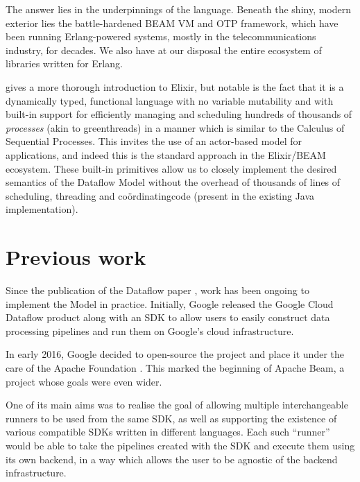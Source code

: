 The answer lies in the underpinnings of the language.
Beneath the shiny, modern exterior lies the battle-hardened BEAM VM and OTP framework, which have been running Erlang-powered systems, mostly in the telecommunications industry, for decades.
We also have at our disposal the entire ecosystem of libraries written for Erlang.

 gives a more thorough introduction to Elixir, but notable is the fact that it is a dynamically typed, functional language with no variable mutability and with built-in support for efficiently managing and scheduling hundreds of thousands of \emph{processes} (akin to greenthreads) in a manner which is similar to the Calculus of Sequential Processes.
This invites the use of an actor-based model for applications, and indeed this is the standard approach in the Elixir/BEAM ecosystem.
These built-in primitives allow us to closely implement the desired semantics of the Dataflow Model without the overhead of thousands of lines of scheduling, threading and co\"ordinating\footnotemark[1] code (present in the existing Java implementation).


\section{Previous work}\label{sec:intro:previous}
Since the publication of the Dataflow paper \cite{Akidau:2015}, work has been ongoing to implement the Model in practice.
Initially, Google released the Google Cloud Dataflow product \cite{CloudDataflow} along with an SDK to allow users to easily construct data processing pipelines and run them on Google's cloud infrastructure.

In early 2016, Google decided to open-source the project and place it under the care of the Apache Foundation \cite{ApacheDataflowPost}.
This marked the beginning of Apache Beam, a project whose goals were even wider.

One of its main aims was to realise the goal of allowing multiple interchangeable runners to be used from the same SDK, as well as supporting the existence of various compatible SDKs written in different languages.
Each such ``runner'' would be able to take the pipelines created with the SDK and execute them using its own backend, in a way which allows the user to be agnostic of the backend infrastructure.

